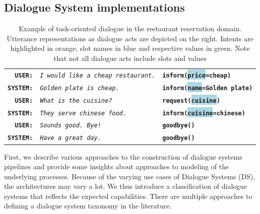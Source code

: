 \subsection{Dialogue System implementations}
\label{02:ds-background}
\begin{table}[t]
\small
\setlength\fboxsep{2pt}
        \centering
        \begin{tabular}{rll}
        \textbf{\texttt{USER:}} & \textit{\texttt{I would like a cheap restaurant.}} & \textbf{\texttt{\colorbox{pastelyellow}{inform}(\colorbox{lightblue}{price}=\colorbox{pastelgreen}{cheap})}} \\
        \textbf{\texttt{SYSTEM:}} & \textit{\texttt{Golden plate is cheap.}} & \textbf{\texttt{\colorbox{pastelyellow}{inform}(\colorbox{lightblue}{name}=\colorbox{pastelgreen}{Golden plate})}} \\
        \hdashline[1.5pt/2pt]
        \textbf{\texttt{USER:}} & \textit{\texttt{What is the cuisine?}} & \textbf{\texttt{\colorbox{pastelyellow}{request}(\colorbox{lightblue}{cuisine})}} \\
        \textbf{\texttt{SYSTEM:}} & \textit{\texttt{They serve chinese food.}} & \textbf{\texttt{\colorbox{pastelyellow}{inform}(\colorbox{lightblue}{cuisine}=\colorbox{pastelgreen}{chinese})}} \\
        \hdashline[1.5pt/2pt]
        \textbf{\texttt{USER:}} & \textit{\texttt{Sounds good. Bye!}} & \textbf{\texttt{\colorbox{pastelyellow}{goodbye}()}} \\
        \textbf{\texttt{SYSTEM:}} & \textit{\texttt{Have a great day.}} & \textbf{\texttt{\colorbox{pastelyellow}{goodbye}()}} \\
        \end{tabular}
\normalsize
        \caption{Example of task-oriented dialogue in the restaurant reservation domain. Utterance representations as dialogue acts are depicted on the right. Intents are highlighted in orange, slot names in blue and respective values in green. Note that not all dialogue acts include slots and values}
    \label{fig:das}
\end{table}
First, we describe various approaches to the construction of dialogue systems pipelines and provide some insights about approaches to modeling of the underlying processes.
Because of the varying use cases of Dialogue Systems (DS), the architectures may vary a lot.
We thus introduce a classification of dialogue systems that reflects the expected capabilities.
There are multiple approaches to defining a dialogue system taxonomy in the literature.
